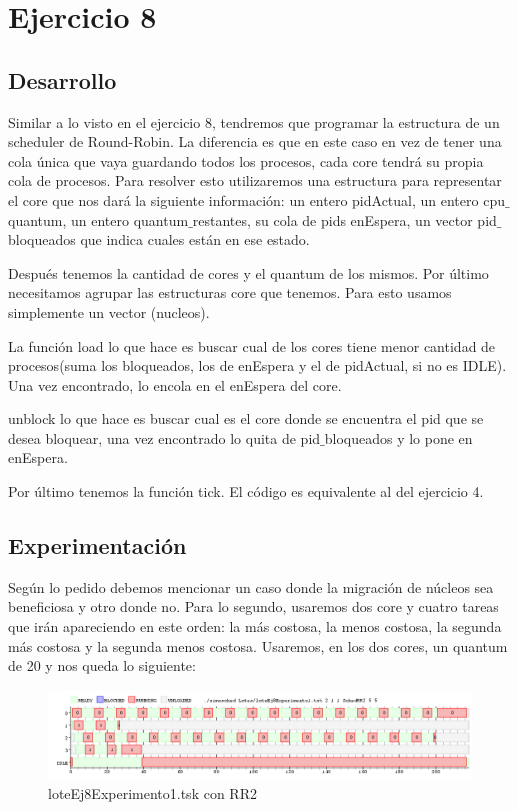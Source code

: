 \section{Ejercicio 8}


\subsection{Desarrollo}
Similar  a lo visto en el ejercicio 8, tendremos que programar la estructura de un scheduler de Round-Robin. La diferencia es que en este caso en vez de tener una cola única 
que vaya guardando todos los procesos, cada core tendrá su propia cola de procesos. Para resolver esto utilizaremos una estructura para representar el core que nos dará la 
siguiente información: un entero pidActual, un entero cpu$\_$quantum, un entero quantum$\_$restantes, su cola de pids enEspera, un vector pid$\_$bloqueados que indica cuales están en ese estado.

Después tenemos la cantidad de cores y el quantum de los mismos. Por último necesitamos agrupar las estructuras core que tenemos. Para esto usamos simplemente un vector 
(nucleos).

La función load lo que hace es buscar cual de los cores tiene menor cantidad de procesos(suma los bloqueados, los de enEspera y el de pidActual, si no es IDLE). Una vez 
encontrado, lo encola en el enEspera del core.

unblock lo que hace es buscar cual es el core donde se encuentra el pid que se desea bloquear, una vez encontrado lo quita de pid$\_$bloqueados y lo pone en enEspera.

Por último tenemos la función tick. El código es equivalente al del ejercicio 4.


\subsection{Experimentación}
Según lo pedido debemos mencionar un caso donde la migración de núcleos sea beneficiosa y otro donde no. Para lo segundo, usaremos dos core y cuatro tareas que irán apareciendo
en este orden: la más costosa,  la menos costosa, la segunda más costosa y la segunda menos costosa. Usaremos, en los dos cores, un quantum de 20 y nos queda lo siguiente:

\begin{figure}[H]
  \centering
    \includegraphics[width=1.1\textwidth]{imagenes/Ej8Experimento1.png}
  \caption{loteEj8Experimento1.tsk con RR2}
\end{figure}

